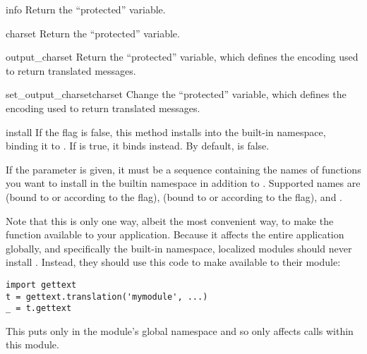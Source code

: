 \begin{methoddesc}[NullTranslations]{info}{}
Return the ``protected''  variable.
\end{methoddesc}

\begin{methoddesc}[NullTranslations]{charset}{}
Return the ``protected''  variable.
\end{methoddesc}

\begin{methoddesc}[NullTranslations]{output_charset}{}
Return the ``protected''  variable, which
defines the encoding used to return translated messages.

\end{methoddesc}

\begin{methoddesc}[NullTranslations]{set_output_charset}{charset}
Change the ``protected''  variable, which
defines the encoding used to return translated messages.

\end{methoddesc}

\begin{methoddesc}[NullTranslations]{install}{}
If the  flag is false, this method installs
 into the built-in namespace, binding it to
\samp{_}.  If  is true, it binds 
instead.  By default,  is false.

If the  parameter is given, it must be a sequence containing
the names of functions you want to install in the builtin namespace in
addition to \function{_()}. Supported names are  (bound
to  or  according to the
 flag),  (bound to 
or  according to the  flag),
 and .

Note that this is only one way, albeit the most convenient way, to
make the \function{_} function available to your application.  Because it
affects the entire application globally, and specifically the built-in
namespace, localized modules should never install \function{_}.
Instead, they should use this code to make \function{_} available to
their module:

\begin{verbatim}
import gettext
t = gettext.translation('mymodule', ...)
_ = t.gettext
\end{verbatim}

This puts \function{_} only in the module's global namespace and so
only affects calls within this module.

\end{methoddesc}

